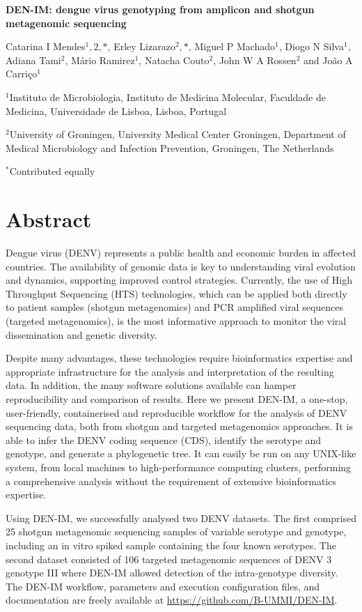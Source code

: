 \cleardoublepage 

\begin{center}
\large
\textbf{DEN-IM: dengue virus genotyping from amplicon and shotgun metagenomic sequencing}
\end{center}

Catarina I Mendes$^1,2,*$, 
Erley Lizarazo$^2,*$,
Miguel P Machado$^1$, 
Diogo N Silva$^1$,
Adiana Tami$^2$,
Mário Ramirez$^1$, 
Natacha Couto$^2$, 
John W A Rossen$^2$ and João A Carriço$^1$


$^1$Instituto de Microbiologia, Instituto de Medicina Molecular, Faculdade de Medicina, Universidade de Lisboa, Lisboa, Portugal 

$^2$University of Groningen, University Medical Center Groningen, Department of Medical Microbiology and Infection Prevention, Groningen, The Netherlands

$^*$Contributed equally

\section{Abstract}

Dengue virus (DENV) represents a public health and economic burden in affected countries. The availability of genomic data is key to understanding viral evolution and dynamics, supporting improved control strategies. Currently, the use of High Throughput Sequencing (HTS) technologies, which can be applied both directly to patient samples (shotgun metagenomics) and PCR amplified viral sequences (targeted metagenomics), is the most informative approach to monitor the viral dissemination and genetic diversity.

Despite many advantages, these technologies require bioinformatics expertise and appropriate infrastructure for the analysis and interpretation of the resulting data. In addition, the many software solutions available can hamper reproducibility and comparison of results.
Here we present DEN-IM, a one-stop, user-friendly, containerised and reproducible workflow for the analysis of DENV sequencing data, both from shotgun and targeted metagenomics approaches. It is able to infer the DENV coding sequence (CDS), identify the serotype and genotype, and generate a phylogenetic tree. It can easily be run on any UNIX-like system, from local machines to high-performance computing clusters, performing a comprehensive analysis without the requirement of extensive bioinformatics expertise.

Using DEN-IM, we successfully analysed two DENV datasets. The first comprised 25 shotgun metagenomic sequencing samples of variable serotype and genotype, including an in vitro spiked sample containing the four known serotypes. The second dataset consisted of 106 targeted metagenomic sequences of DENV 3 genotype III where DEN-IM allowed detection of the intra-genotype diversity.
The DEN-IM workflow, parameters and execution configuration files, and documentation are freely available at \url{https://github.com/B-UMMI/DEN-IM}.

